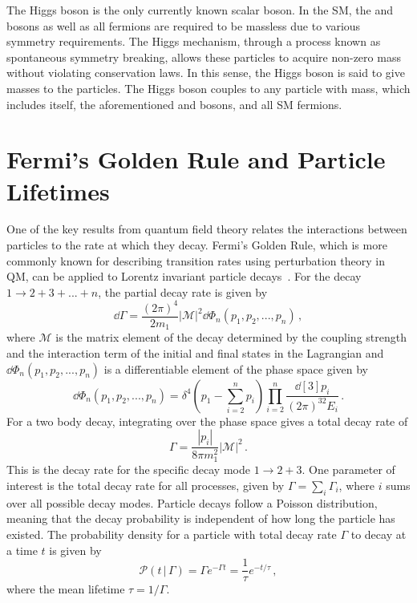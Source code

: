 The Higgs boson is the only currently known scalar boson. In the SM, the \PZ and \PWpm bosons as well as all fermions are required to be massless due to various symmetry requirements. The Higgs mechanism, through a process known as spontaneous symmetry breaking, allows these particles to acquire non-zero mass without violating conservation laws. In this sense, the Higgs boson is said to give masses to the particles. The Higgs boson couples to any particle with mass, which includes itself, the aforementioned \PZ and \PWpm bosons, and all SM fermions.

\section{Fermi's Golden Rule and Particle Lifetimes} \label{sec:theory_fermi}
One of the key results from quantum field theory relates the interactions between particles to the rate at which they decay. Fermi's Golden Rule, which is more commonly known for describing transition rates using perturbation theory in QM, can be applied to Lorentz invariant particle decays~\cite{pdg2024}. For the decay $1\to2+3+...+n$, the partial decay rate is given by
\begin{equation}
	\dd{\Gamma}=\frac{(2\pi)^4}{2m_1}|\mathcal{M}|^2\dd{\Phi_n(p_1,p_2,...,p_n)}\,,
\end{equation}
where $\mathcal{M}$ is the matrix element of the decay determined by the coupling strength and the interaction term of the initial and final states in the Lagrangian and $\dd{\Phi_n(p_1,p_2,...,p_n)}$ is a differentiable element of the phase space given by
\begin{equation}
	\dd{\Phi_n(p_1,p_2,...,p_n)}=\delta^4(p_1-\sum_{i=2}^n p_i)\prod_{i=2}^n\frac{\dd[3]{p_i}}{(2\pi)^32E_i}\,.
\end{equation}
For a two body decay, integrating over the phase space gives a total decay rate of
\begin{equation}
	\Gamma=\frac{|p_i|}{8\pi m_1^2}|\mathcal{M}|^2\,.
\end{equation}
This is the decay rate for the specific decay mode $1\to2+3$. One parameter of interest is the total decay rate for all processes, given by $\Gamma=\sum_{i}\Gamma_i$, where $i$ sums over all possible decay modes. Particle decays follow a Poisson distribution, meaning that the decay probability is independent of how long the particle has existed. The probability density for a particle with total decay rate $\Gamma$ to decay at a time $t$ is given by
\begin{equation}
	\mathcal{P}(t\,|\,\Gamma)=\Gamma e^{-\Gamma t}=\frac{1}{\tau}e^{-t/\tau}\,,
\end{equation}
where the mean lifetime $\tau=1/\Gamma$.

